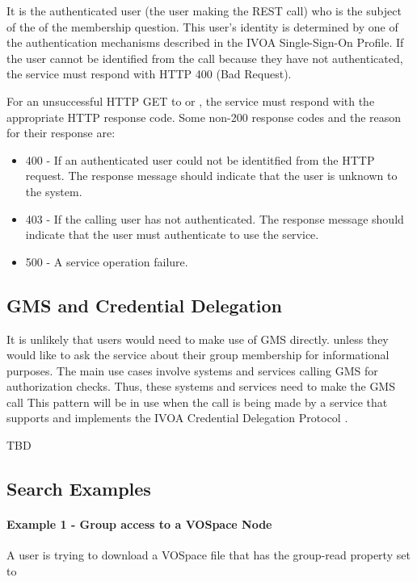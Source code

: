 \documentclass[11pt,a4paper]{ivoa}
\begin{document}
It is the authenticated user (the user making the REST call) who is the subject of the of the membership question.  This user's identity is determined by one of the authentication mechanisms described in the IVOA Single-Sign-On Profile.  If the user cannot be identified from the call because they have not authenticated, the service must respond with HTTP 400 (Bad Request).

For an unsuccessful HTTP GET to  or , the service must respond with the appropriate HTTP response code.  Some non-200 response codes and the reason for their response are:

\begin{itemize}
\item{400} - If an authenticated user could not be identitfied from the HTTP request.  The response message should indicate that the user is unknown to the system.
\item{403} - If the calling user has not authenticated.  The response message should indicate that the user must authenticate to use the service.
\item{500} - A service operation failure.  
\end{itemize}

\subsection {GMS and Credential Delegation}

It is unlikely that users would need to make use of GMS directly.   unless they would like to ask the service about their group membership for informational purposes.  The main use cases involve systems and services calling GMS for authorization checks.
  Thus, these systems and services need to make the GMS call
This pattern will be in use when the call is being made by a service that supports and implements the IVOA Credential Delegation Protocol \citep{2010ivoa.spec.0218P}.

TBD

\subsection {Search Examples}

\paragraph{Example 1 - Group access to a VOSpace Node}

A user is trying to download a VOSpace file that has the group-read property set to
\end{document}
